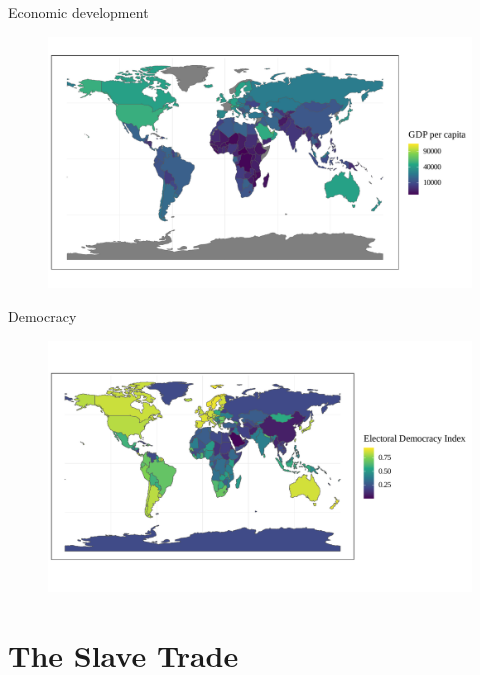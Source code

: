 \documentclass{beamer}
\begin{document}
\begin{frame}{Economic development}
	\begin{figure}
		\includegraphics[width=\linewidth]{img/gdpplot.pdf}
	\end{figure}
\end{frame}

\begin{frame}{Democracy}
	\begin{figure} 
		\includegraphics[width=\linewidth]{img/vdemplot.pdf}
	\end{figure}
\end{frame}

\section{The Slave Trade}
\end{document}
